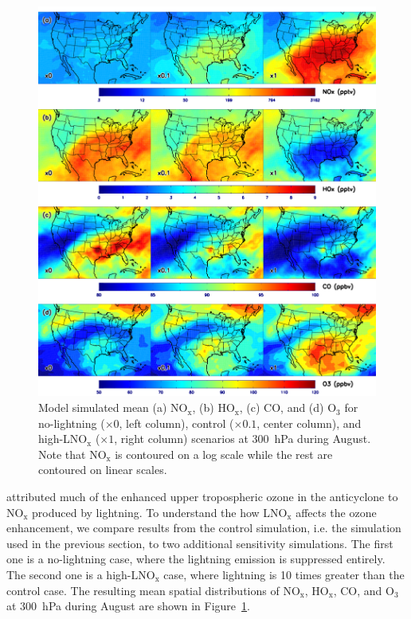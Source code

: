  \begin{figure}
 \noindent\includegraphics[width=40pc]{figures/ltngsens_map.png}
 \caption{Model simulated mean (a) NO$_{\mathrm{x}}$, (b) HO$_{\mathrm{x}}$,
(c) CO, and (d) O$_3$ for no-lightning ($\times0$, left column), control ($\times0.1$, center
column), and high-LNO$_{\mathrm{x}}$ ($\times1$, right column) scenarios at 300~hPa
during August. Note that NO$_{\mathrm{x}}$ is contoured on a log scale
while the rest are contoured on linear scales.}
 \label{fig:ltng_map}
 \end{figure}

\citet{Cooper:2007cr} attributed much of the enhanced upper tropospheric ozone in the
anticyclone to $\mathrm{NO_x}$ produced by lightning. To understand the how LNO$_{\mathrm{x}}$
affects the ozone enhancement, we compare results from the control simulation, i.e.
the simulation used in the previous section, to two additional sensitivity simulations.
The first one is a no-lightning case, where the lightning emission is suppressed entirely.
The second one is a high-$\mathrm{LNO_x}$ case, where lightning is 10 times greater
than the control case. The resulting mean spatial
distributions of NO$_{\mathrm{x}}$, HO$_{\mathrm{x}}$, CO, and O$_3$ at 300~hPa
during August are shown in Figure~\ref{fig:ltng_map}.

